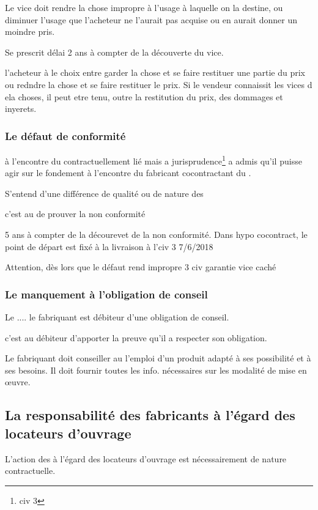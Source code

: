 			Le vice doit rendre la chose impropre à l'usage à laquelle on la destine, ou diminuer l'usage que l'acheteur ne l'aurait pas acquise ou en aurait donner un moindre pris.

			Se prescrit délai 2 ans à compter de la découverte du vice.

			l'acheteur à le choix entre garder la chose et se faire restituer une partie du prix ou redndre la  chose et se faire restituer le prix. Si le vendeur connaissit les vices d ela choses, il peut etre tenu, outre la restitution du prix,  des dommages et inyerets.

		\subsubsection{Le défaut de conformité}

			à l'encontre du contractuellement lié mais a jurisprudence\footnote{civ 3} a admis qu'il puisse agir sur le fondement à l'encontre du fabricant  cocontractant du \lo.

			S'entend d'une différence de qualité ou de nature des

			c'est au \Mo de prouver la non conformité

			5 ans à compter de la décourevet de la non conformité. Dans hypo cocontract, le point de départ est fixé à la livraison à l'\E civ 3 7/6/2018

			Attention, dès lors que le défaut rend impropre 3 civ garantie vice caché

		\subsubsection{Le manquement à l'obligation de conseil}

			Le \Mo .... le fabriquant est débiteur d'une obligation de conseil.

			c'est au débiteur d'apporter la preuve qu'il a respecter son obligation.

			Le fabriquant doit conseiller au \Mo l'emploi d'un produit adapté à ses possibilité et à ses besoins. Il doit fournir toutes les info. nécessaires sur les modalité de mise en œuvre.

	\subsection{La responsabilité des fabricants à l'égard des locateurs d'ouvrage}

		L'action des \lo à l'égard des locateurs d'ouvrage est nécessairement de nature contractuelle.

